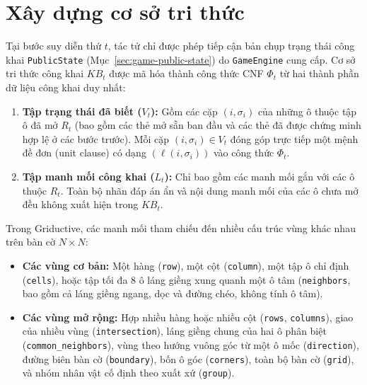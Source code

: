 \section{Xây dựng cơ sở tri thức}
Tại bước suy diễn thứ $t$, tác tử chỉ được phép tiếp cận bản chụp trạng thái công khai \texttt{PublicState} (Mục~\ref{sec:game-public-state}) do \texttt{GameEngine} cung cấp. Cơ sở tri thức công khai $KB_t$ được mã hóa thành công thức CNF $\Phi_t$ từ hai thành phần dữ liệu công khai duy nhất:

\begin{enumerate}
    \item \textbf{Tập trạng thái đã biết ($V_t$):} Gồm các cặp $(i, \sigma_i)$ của những ô thuộc tập ô đã mở $R_t$ (bao gồm các thẻ mở sẵn ban đầu và các thẻ đã được chứng minh hợp lệ ở các bước trước). Mỗi cặp $(i, \sigma_i) \in V_t$ đóng góp trực tiếp một mệnh đề đơn (unit clause) có dạng $(\ell(i, \sigma_i))$ vào công thức $\Phi_t$.

    \item \textbf{Tập manh mối công khai ($L_t$):} Chỉ bao gồm các manh mối gắn với các ô thuộc $R_t$. Toàn bộ nhãn đáp án ẩn và nội dung manh mối của các ô chưa mở đều không xuất hiện trong $KB_t$.
\end{enumerate}

Trong Griductive, các manh mối tham chiếu đến nhiều cấu trúc vùng khác nhau trên bàn cờ $N \times N$:
\begin{itemize}
    \item \textbf{Các vùng cơ bản:} Một hàng (\texttt{row}), một cột (\texttt{column}), một tập ô chỉ định (\texttt{cells}), hoặc tập tối đa $8$ ô láng giềng xung quanh một ô tâm (\texttt{neighbors}, bao gồm cả láng giềng ngang, dọc và đường chéo, không tính ô tâm).
    \item \textbf{Các vùng mở rộng:} Hợp nhiều hàng hoặc nhiều cột (\texttt{rows}, \texttt{columns}), giao của nhiều vùng (\texttt{intersection}), láng giềng chung của hai ô phân biệt (\texttt{common\_neighbors}), vùng theo hướng vuông góc từ một ô mốc (\texttt{direction}), đường biên bàn cờ (\texttt{boundary}), bốn ô góc (\texttt{corners}), toàn bộ bàn cờ (\texttt{grid}), và nhóm nhân vật cố định theo xuất xứ (\texttt{group}).
\end{itemize}

